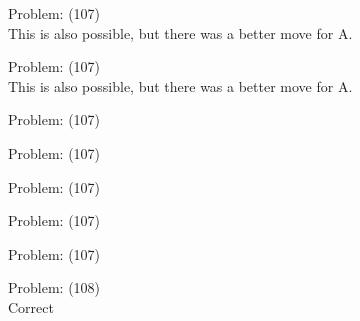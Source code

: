 \documentclass[11pt]{article}
\begin{document}
\begin{minipage}[t]{0.5\textwidth}
  {\centering
  
Problem: (107)\\
This is also possible, but there was a better move for A.\\
  }
\end{minipage}
\begin{minipage}[t]{0.5\textwidth}
  {\centering
  
Problem: (107)\\
This is also possible, but there was a better move for A.\\
  }
\end{minipage}
\begin{minipage}[t]{0.5\textwidth}
  {\centering
  
Problem: (107)\\
  }
\end{minipage}
\begin{minipage}[t]{0.5\textwidth}
  {\centering
  
Problem: (107)\\
  }
\end{minipage}
\begin{minipage}[t]{0.5\textwidth}
  {\centering
  
Problem: (107)\\
  }
\end{minipage}
\begin{minipage}[t]{0.5\textwidth}
  {\centering
  
Problem: (107)\\
  }
\end{minipage}
\begin{minipage}[t]{0.5\textwidth}
  {\centering
  
Problem: (107)\\
  }
\end{minipage}
\begin{minipage}[t]{0.5\textwidth}
  {\centering
  
Problem: (108)\\
Correct\\
  }
\end{minipage}
\end{document}
